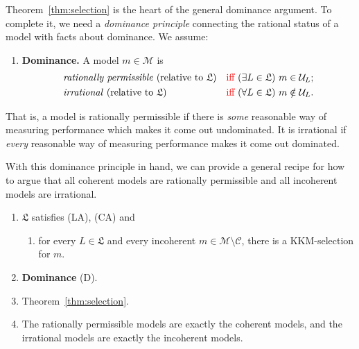 \documentclass[11pt]{article}
\newcommand{\chg}[1]{{\color{red}#1}}
\theoremstyle{definition}
\theoremstyle{remark}
\newcommand{\M}{\mathcal M}
\newcommand{\C}{\mathcal C}
\newcommand{\U}{\mathcal U}
\newcommand{\Lf}{\mathfrak L}
\begin{document}
Theorem~\ref{thm:selection} is the heart of the general dominance argument. To complete it, we need a \textit{dominance principle} connecting the rational status of a model with facts about dominance. We assume:
\begin{enumerate}[label=\textbf{(D)},leftmargin=*]
\item\label{principle:dominance} \textbf{Dominance.} A model $m\in\M$ is
\begin{align*}
&\text{\emph{rationally permissible} (relative to $\Lf$)}&&\text{\chg{iff} }(\exists L\in\Lf)\ m\in\U_L;\\
&\text{\emph{irrational} (relative to $\Lf$)}&&\text{\chg{iff} }(\forall L\in\Lf)\ m\notin\U_L.
\end{align*}
\end{enumerate}
That is, a model is rationally permissible if there is \textit{some} reasonable way of measuring performance which makes it come out undominated. It is irrational if \textit{every} reasonable way of measuring performance makes it come out dominated.







With this dominance principle in hand, we can provide a general recipe for how to argue that all coherent models are rationally permissible and all incoherent models are irrational.
\begin{enumerate}[label=\textbf{(P\arabic*)},leftmargin=*]
\item $\Lf$ satisfies (LA), (CA) and
\begin{enumerate}
\item[(S)]\label{condition:selection} for every $L\in\Lf$ and every incoherent $m\in\M\setminus\C$, there is a KKM-selection for $m$.
\end{enumerate}
\item \textbf{Dominance} (D).
\item Theorem~\ref{thm:selection}.
\item[\textbf{(C)}]\label{conclusion:complete-class} The rationally permissible models are exactly the coherent models, and the irrational models are exactly the incoherent models.
\end{enumerate}
\end{document}
